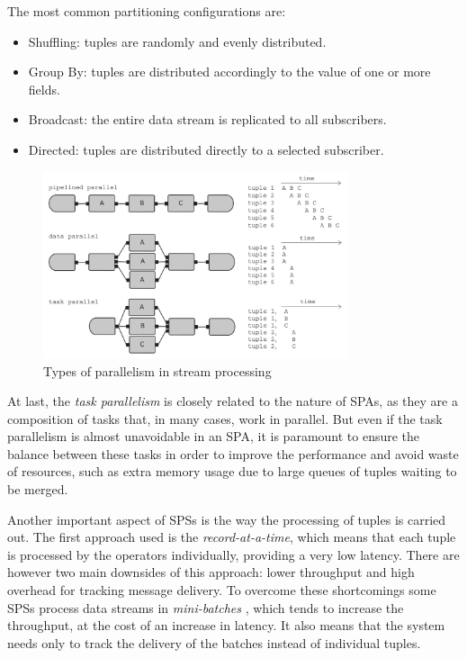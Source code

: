 \documentclass[ppgc,diss,english]{iiufrgs}
\begin{document}
The most common partitioning configurations are:

\begin{itemize}
\item Shuffling: tuples are randomly and evenly distributed.
\item Group By: tuples are distributed accordingly to the value of one or more fields.
\item Broadcast: the entire data stream is replicated to all subscribers.
\item Directed: tuples are distributed directly to a selected subscriber.
\end{itemize}

\begin{figure}[!ht]
	\centering
	\includegraphics[width=0.8\textwidth]{images/sps_parallelism.png}
	\caption[Types of parallelism in stream processing]{Types of parallelism in stream processing \cite{andrade2014fundamentals}}
	\label{fig:sps_parallelism}
\end{figure}

At last, the \emph{task parallelism} is closely related to the nature of SPAs, as they are a composition of tasks that, in many cases, work in parallel. But even if the task parallelism is almost unavoidable in an SPA, it is paramount to ensure the balance between these tasks in order to improve the performance and avoid waste of resources, such as extra memory usage due to large queues of tuples waiting to be merged.


Another important aspect of SPSs is the way the processing of tuples is carried out. The first approach used is the \emph{record-at-a-time}, which means that each tuple is processed by the operators individually, providing a very low latency. There are however two main downsides of this approach: lower throughput and high overhead for tracking message delivery. To overcome these shortcomings some SPSs process data streams in \emph{mini-batches} \cite{muralidharan2014fault}, which tends to increase the throughput, at the cost of an increase in latency. It also means that the system needs only to track the delivery of the batches instead of individual tuples.
\end{document}
